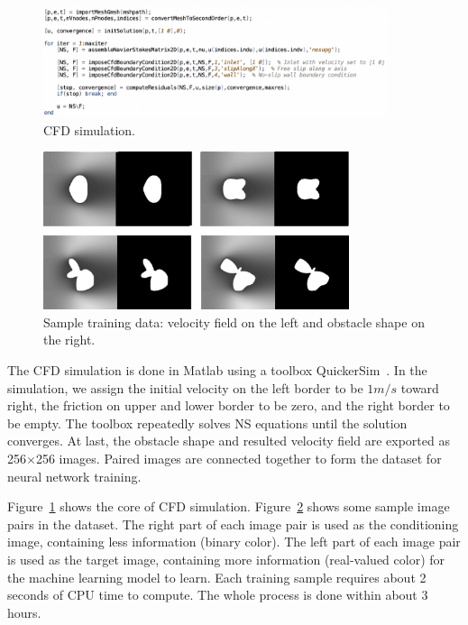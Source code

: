 \documentclass[12pt]{article}
\begin{document}
\begin{figure}[htp]
 \centering
 \includegraphics[width=0.9\textwidth]{CFD.png}
 \caption{CFD simulation.}
 \label{fig:CFD}
\end{figure}

\begin{figure}[htp]
 \centering
 \includegraphics[width=0.8\textwidth]{training.png}
 \caption{Sample training data: velocity field on the left and obstacle shape 
on the right.}
 \label{fig:data}
\end{figure}

The CFD simulation is done in Matlab using a toolbox 
QuickerSim~\cite{quickersim}.
In the simulation, we assign the initial velocity on the left border to be 
$1m/s$ toward right, the friction on upper and lower border to be zero, and the 
right border to be empty.
The toolbox repeatedly solves NS equations until the solution converges.
At last, the obstacle shape and resulted velocity field are exported as 
256$\times$256 images.
Paired images are connected together to form the dataset for neural network 
training.

Figure~\ref{fig:CFD} shows the core of CFD simulation.
Figure~\ref{fig:data} shows some sample image pairs in the dataset.
The right part of each image pair is used as the conditioning image, containing less information (binary color).
The left part of each image pair is used as the target image, containing more information (real-valued color) for the machine learning model to learn.
Each training sample requires about 2 seconds of CPU time to compute. 
The whole process is done within about 3 hours. 
\end{document}
